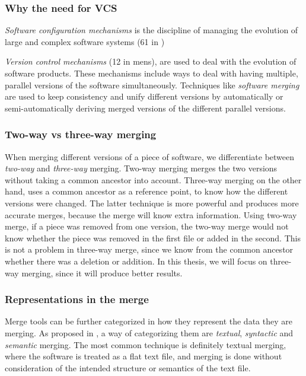 \documentclass[a4paper,english]{ifimaster}
\begin{document}
\subsubsection{Why the need for VCS}%
\label{ssub:why_the_need_for_vcs}

\textit{Software configuration mechanisms} is the discipline of managing the evolution of large and complex software systems (61 in \parencite{cite:tom_mens_software_merging_survey})

\textit{Version control mechanisms} (12 in mens), are used to deal with the evolution of software products. These mechanisms include ways to deal with having multiple, parallel versions of the software simultaneously. Techniques like \textit{software merging} are used to keep consistency and unify different versions by automatically or semi-automatically deriving merged versions of the different parallel versions.

\subsubsection{Two-way vs three-way merging}%
\label{ssub:two_way_vs_three_way_merging}

When merging different versions of a piece of software, we differentiate between \textit{two-way} and \textit{three-way} merging. Two-way merging merges the two versions without taking a common ancestor into account. Three-way merging on the other hand, uses a common ancestor as a reference point, to know how the different versions were changed. The latter technique is more powerful and produces more accurate merges, because the merge will know extra information. Using two-way merge, if a piece was removed from one version, the two-way merge would not know whether the piece was removed in the first file or added in the second. This is not a problem in three-way merge, since we know from the common ancestor whether there was a deletion or addition. In this thesis, we will focus on three-way merging, since it will produce better results.

\subsubsection{Representations in the merge}%
\label{ssub:representations_in_the_merge}

Merge tools can be further categorized in how they represent the data they are merging. As proposed in \parencite{cite:tom_mens_software_merging_survey}, a way of categorizing them are \textit{textual}, \textit{syntactic} and \textit{semantic} merging. The most common technique is definitely textual merging, where the software is treated as a flat text file, and merging is done without consideration of the intended structure or semantics of the text file.
\end{document}
